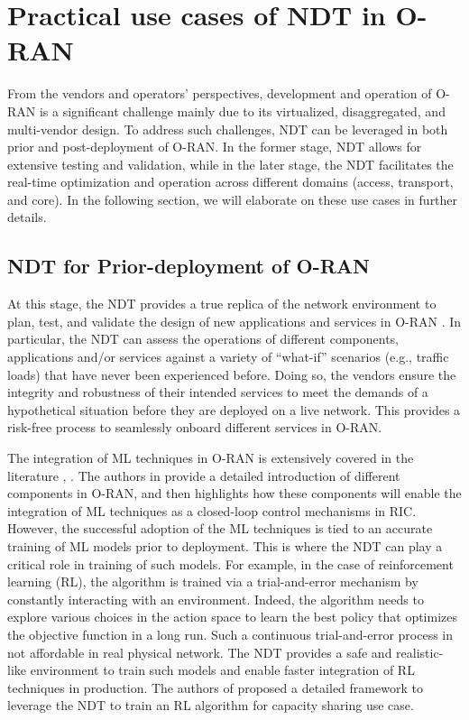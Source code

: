 \documentclass[]{IEEEtran}
\begin{document}
	
	\section{Practical use cases of NDT in O-RAN}\label{sec:Practical_NDT}

	
	From the vendors and operators' perspectives,
	development and operation of O-RAN is a significant challenge mainly due to its virtualized, disaggregated, and multi-vendor design. To address such challenges, NDT can be leveraged in both prior and post-deployment of O-RAN. In the former stage, NDT allows for extensive testing and validation, while in the later stage, the NDT facilitates the real-time optimization and operation across different domains (access, transport, and core). In the following section, we will elaborate on these use cases in further details.
	
	\subsection{NDT for Prior-deployment of O-RAN}
	At this stage, the NDT provides a true replica of the network environment to plan, test, and validate the design of new applications and services in O-RAN \cite{9696282}. In particular, the NDT can assess the operations of different components, applications and/or services against a variety of “what-if” scenarios (e.g., traffic loads) that have never been experienced before. Doing so, the vendors ensure the integrity and robustness of their intended services to meet the demands of a hypothetical situation before they are deployed on a live network. This provides a risk-free process to seamlessly onboard different services in O-RAN. 
	
	The integration of ML techniques in O-RAN is extensively covered in the literature \cite{O-RAN_IEEE}, \cite{ORAN_Alliance1}. The authors in \cite{O-RAN_IEEE} provide a detailed introduction of different components in O-RAN, and then highlights how these components will enable the integration of ML techniques as a closed-loop control mechanisms in RIC. However, the successful adoption of the ML techniques is tied to an accurate training of ML models prior to deployment. This is where the NDT can play a critical role in training of such models. For example, in the case of reinforcement learning (RL), the algorithm is trained via a trial-and-error mechanism by constantly interacting with an environment. Indeed, the algorithm needs to explore various choices in the action space to learn the best policy that optimizes the objective function in a long run. Such a continuous trial-and-error process in not affordable in real physical network. The NDT provides a safe and realistic-like environment to train such models and enable faster integration of RL techniques in production. The authors of \cite{s23031197} proposed a detailed framework to leverage the NDT to train an RL algorithm for capacity sharing use case.
\end{document}
